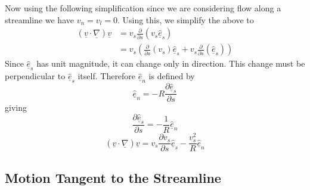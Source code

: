 Now using the following simplification since we are considering flow along a streamline we have $v_{n}=v_{l}=0$.
Using this, we simplify the above to
\begin{equation*}
  \begin{split}
    (\underline{v}\cdot\underline{\nabla})\underline{v}
    &=v_{s}\frac{\partial}{\partial{}s}(v_{s}\hat{\underline{e}}_{s}) \\
    &=v_{s}\left(\frac{\partial}{\partial{}s}(v_{s})\hat{\underline{e}}_{s}+v_{s}\frac{\partial}{\partial{}s}(\hat{\underline{e}}_{s})\right)
  \end{split}
\end{equation*}
Since $\hat{\underline{e}}_{s}$ has unit magnitude, it can change only in direction.
This change must be perpendicular to $\hat{\underline{e}}_{s}$ itself.
Therefore $\hat{\underline{e}}_{n}$ is defined by
\begin{equation*}
  \hat{\underline{e}}_{n}=-R\frac{\partial\hat{\underline{e}}_{s}}{\partial{}s}
\end{equation*}
giving
\begin{equation*}
  \frac{\partial\hat{\underline{e}}_{s}}{\partial{}s}=-\frac{1}{R}\hat{\underline{e}}_{n}
\end{equation*}
\begin{equation*}
  (\underline{v}\cdot\underline{\nabla})\underline{v}
  =v_{s}\frac{\partial{}v_{s}}{\partial{}s}\hat{\underline{e}}_{s}-\frac{v_{s}^{2}}{R}\hat{\underline{e}}_{n}
\end{equation*}

\subsection{Motion Tangent to the Streamline}

